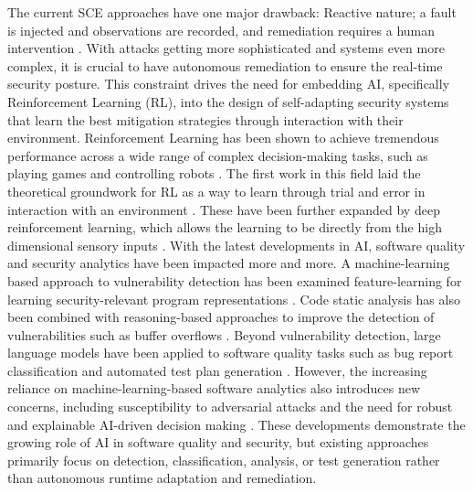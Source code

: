 \documentclass[pdflatex,sn-mathphys-num]{sn-jnl}%
\theoremstyle{thmstyleone}%
\theoremstyle{thmstyletwo}%
\theoremstyle{thmstylethree}%
\begin{document}
	The current SCE approaches have one major drawback: Reactive nature; a fault is injected and observations are recorded, and remediation requires a human intervention \cite{owotogbe2025chaos}. With attacks getting more sophisticated and systems even more complex, it is crucial to have autonomous remediation to ensure the real-time security posture. This constraint drives the need for embedding AI, specifically Reinforcement Learning (RL), into the design of self-adapting security systems that learn the best mitigation strategies through interaction with their environment.	Reinforcement Learning has been shown to achieve tremendous performance across a wide range of complex decision-making tasks, such as playing games and controlling robots \cite{silver2016mastering, schulman2017ppo}. The first work in this field laid the theoretical groundwork for RL as a way to learn through trial and error in interaction with an environment \cite{sutton1998reinforcement}. These have been further expanded by deep reinforcement learning, which allows the learning to be directly from the high dimensional sensory inputs \cite{mnih2015human}. With the latest developments in AI, software quality and security analytics have been impacted more and more. A machine-learning based approach to vulnerability detection has been examined feature-learning for learning security-relevant program representations \cite{tong2026osel}. Code static analysis has also been combined with reasoning-based approaches to improve the detection of vulnerabilities such as buffer overflows \cite{huang2026cotstatic}. Beyond vulnerability detection, large language models have been applied to software quality tasks such as bug report classification \cite{du2024llmbrc} and automated test plan generation \cite{haldar2026testplan}. However, the increasing reliance on machine-learning-based software analytics also introduces new concerns, including susceptibility to adversarial attacks and the need for robust and explainable AI-driven decision making \cite{awal2025adversarial}. These developments demonstrate the growing role of AI in software quality and security, but existing approaches primarily focus on detection, classification, analysis, or test generation rather than autonomous runtime adaptation and remediation.
	
\end{document}
